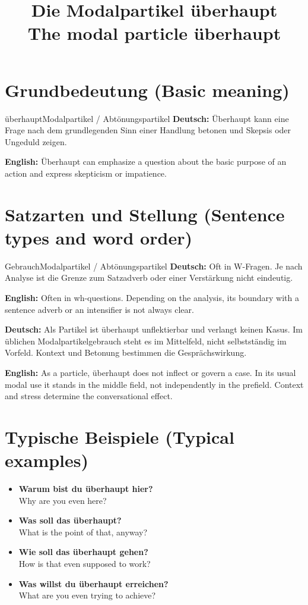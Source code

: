 \documentclass[a4paper,11pt]{article}
\title{Die Modalpartikel \glqq überhaupt\grqq\\{\large\textnormal{The modal particle überhaupt}}}
\date{}
\newcommand{\GermanText}[1]{\textbf{Deutsch: }#1\par}
\newcommand{\EnglishText}[1]{{\small\color{SoftGray}\textbf{English: }#1\par}}
\newcommand{\ExampleItem}[2]{\item \textbf{#1}\\{\small\color{SoftGray}#2}}
\begin{document}
\maketitle
\tableofcontents
\section{Grundbedeutung \textnormal{(Basic meaning)}}
\begin{grammarentry}{überhaupt}{Modalpartikel / Abtönungspartikel}
\GermanText{Überhaupt kann eine Frage nach dem grundlegenden Sinn einer Handlung betonen und Skepsis oder Ungeduld zeigen.}
\EnglishText{Überhaupt can emphasize a question about the basic purpose of an action and express skepticism or impatience.}
\end{grammarentry}
\section{Satzarten und Stellung \textnormal{(Sentence types and word order)}}
\begin{grammarentry}{Gebrauch}{Modalpartikel / Abtönungspartikel}
\GermanText{Oft in W-Fragen. Je nach Analyse ist die Grenze zum Satzadverb oder einer Verstärkung nicht eindeutig.}
\EnglishText{Often in wh-questions. Depending on the analysis, its boundary with a sentence adverb or an intensifier is not always clear.}
\end{grammarentry}
\GermanText{Als Partikel ist überhaupt unflektierbar und verlangt keinen Kasus. Im üblichen Modalpartikelgebrauch steht es im Mittelfeld, nicht selbstständig im Vorfeld. Kontext und Betonung bestimmen die Gesprächswirkung.}
\EnglishText{As a particle, überhaupt does not inflect or govern a case. In its usual modal use it stands in the middle field, not independently in the prefield. Context and stress determine the conversational effect.}
\section{Typische Beispiele \textnormal{(Typical examples)}}
\begin{exbox}\begin{itemize}
\ExampleItem{Warum bist du überhaupt hier?}{Why are you even here?}
\ExampleItem{Was soll das überhaupt?}{What is the point of that, anyway?}
\ExampleItem{Wie soll das überhaupt gehen?}{How is that even supposed to work?}
\ExampleItem{Was willst du überhaupt erreichen?}{What are you even trying to achieve?}
\end{itemize}\end{exbox}
\end{document}
